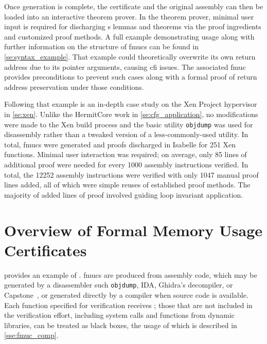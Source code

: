 Once generation is complete, the certificate and the original assembly%
can then be loaded into an interactive theorem prover.
In the theorem prover,
minimal user input is required for discharging s lemmas and theorems
via the proof ingredients and customized proof methods.%
%
A full example demonstrating usage along with 
further information on the structure of \acp{fmuc}
can be found in \cref{se:syntax_example}.
That example could theoretically overwrite
its own return address due to its pointer arguments, causing \ac{cfi} issues.
The associated \ac{fmuc} provides preconditions to prevent such cases
along with a formal proof of return address preservation under those conditions.

Following that example is an in-depth case study
on the Xen Project hypervisor~\citep{chisnall2008definitive} in \cref{se:xen}.
Unlike the HermitCore work in \cref{se:cfg_application},
no modifications were made to the Xen build process
and the basic utility \texttt{objdump} was used for disassembly
rather than a tweaked version of a less-commonly-used utility.
In total, \acp{fmuc} were generated and proofs discharged in Isabelle
for 251 Xen functions.
Minimal user interaction was required;
on average, only \num{85} lines of additional proof were needed
for every \num{1000} assembly instructions verified.
In total, the \num{12252} assembly instructions
were verified with only \num{1047} manual proof lines added,
all of which were simple reuses of established proof methods.
The majority of added lines of proof involved guiding loop invariant application.

\section{Overview of Formal Memory Usage Certificates}\label{se:fmuc_overview}
 provides an example of .
\Acp{fmuc} are produced from assembly code,
which may be generated by a disassembler such \texttt{objdump},
IDA,
Ghidra's decompiler, or Capstone~\citep{capstone},
or generated directly by a compiler when source code is available.
Each function specified for verification receives ;
those that are not included in the verification effort,%
including system calls and functions from dynamic libraries,
can be treated as black boxes,
the usage of which is described in \cref{sse:fmuc_comp}.

